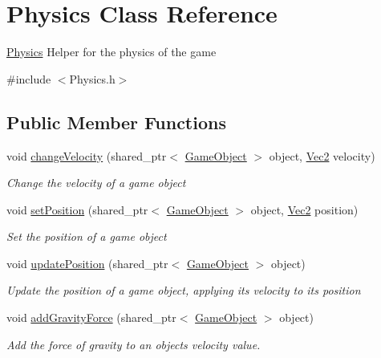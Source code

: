 \hypertarget{class_physics}{}\section{Physics Class Reference}
\label{class_physics}


\mbox{\hyperlink{class_physics}{Physics}} Helper for the physics of the game  




{\ttfamily \#include $<$Physics.\+h$>$}

\subsection*{Public Member Functions}
\begin{DoxyCompactItemize}
\item 
void \mbox{\hyperlink{class_physics_a3baa430406c9017c1de92ed9c35dc9a2}{change\+Velocity}} (shared\+\_\+ptr$<$ \mbox{\hyperlink{class_game_object}{Game\+Object}} $>$ object, \mbox{\hyperlink{struct_vec2}{Vec2}} velocity)
\begin{DoxyCompactList}\small\item\em Change the velocity of a game object \end{DoxyCompactList}\item 
void \mbox{\hyperlink{class_physics_aef3b1d8a37d4eea381dfe48779188b38}{set\+Position}} (shared\+\_\+ptr$<$ \mbox{\hyperlink{class_game_object}{Game\+Object}} $>$ object, \mbox{\hyperlink{struct_vec2}{Vec2}} position)
\begin{DoxyCompactList}\small\item\em Set the position of a game object \end{DoxyCompactList}\item 
void \mbox{\hyperlink{class_physics_acd65e09cdd0dbb9648956c8d174bb621}{update\+Position}} (shared\+\_\+ptr$<$ \mbox{\hyperlink{class_game_object}{Game\+Object}} $>$ object)
\begin{DoxyCompactList}\small\item\em Update the position of a game object, applying it\textquotesingle{}s velocity to it\textquotesingle{}s position \end{DoxyCompactList}\item 
void \mbox{\hyperlink{class_physics_a00639bda7da3c9e8c8b726de6104c64d}{add\+Gravity\+Force}} (shared\+\_\+ptr$<$ \mbox{\hyperlink{class_game_object}{Game\+Object}} $>$ object)
\begin{DoxyCompactList}\small\item\em Add the force of gravity to an objects velocity value. \end{DoxyCompactList}\end{DoxyCompactItemize}


